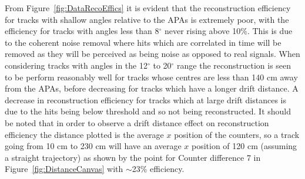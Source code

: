 From Figure~\ref{fig:DataRecoEffics} it is evident that the reconstruction efficiency for tracks with shallow angles relative to the APAs is extremely poor, with the efficiency for tracks with angles less than 8$^{\circ}$ never rising above 10\%. This is due to the coherent noise removal where hits which are correlated in time will be removed as they will be perceived as being noise as opposed to real signals. When considering tracks with angles in the 12$^{\circ}$ to 20$^{\circ}$ range the reconstruction is seen to be perform reasonably well for tracks whose centres are less than 140 cm away from the APAs, before decreasing for tracks which have a longer drift distance. A decrease in reconstruction efficiency for tracks which at large drift distances is due to the hits being below threshold and so not being reconstructed. It should be noted that in order to observe a drift distance effect on reconstruction efficiency the distance plotted is the average $x$ position of the counters, so a track going from 10 cm to 230 cm will have an average $x$ position of 120 cm (assuming a straight trajectory) as shown by the point for Counter difference 7 in Figure~\ref{fig:DistanceCanvas} with $\sim$23\% efficiency. \\

